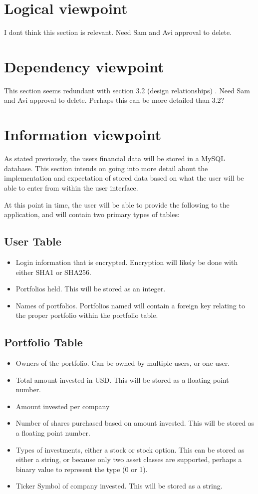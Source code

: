 \documentclass[onecolumn, draftclsnofoot,10pt, compsoc]{IEEEtran}
\begin{document}
\section{Logical viewpoint}
I dont think this section is relevant. Need Sam and Avi approval to delete.
\section{Dependency viewpoint}
This section seems redundant with section 3.2 (design relationships) . Need Sam and Avi approval to delete. Perhaps this can be more detailed than 3.2?
\section{Information viewpoint}
As stated previously, the users financial data will be stored in a MySQL database. This section intends on going into more detail about the implementation and expectation of stored data based on what the user will be able to enter from within the user interface.

At this point in time, the user will be able to provide the following to the application, and will contain two primary types of tables:

\subsection{User Table}
\begin{itemize}
    \item Login information that is encrypted. Encryption will likely be done with either SHA1 or SHA256. 
    \item Portfolios held. This will be stored as an integer.
    \item Names of portfolios. Portfolios named will contain a foreign key relating to the proper portfolio within the portfolio table.
\end{itemize}
\subsection{Portfolio Table}
\begin{itemize}
    \item Owners of the portfolio. Can be owned by multiple users, or one user.
    \item Total amount invested in USD. This will be stored as a floating point number.
    \item Amount invested per company
    \item Number of shares purchased based on amount invested. This will be stored as a floating point number.
    \item Types of investments, either a stock or stock option. This can be stored as either a string, or because only two asset classes are supported, perhaps a binary value to represent the type (0 or 1).
    \item Ticker Symbol of company invested. This will be stored as a string.

\end{itemize}
\end{document}
